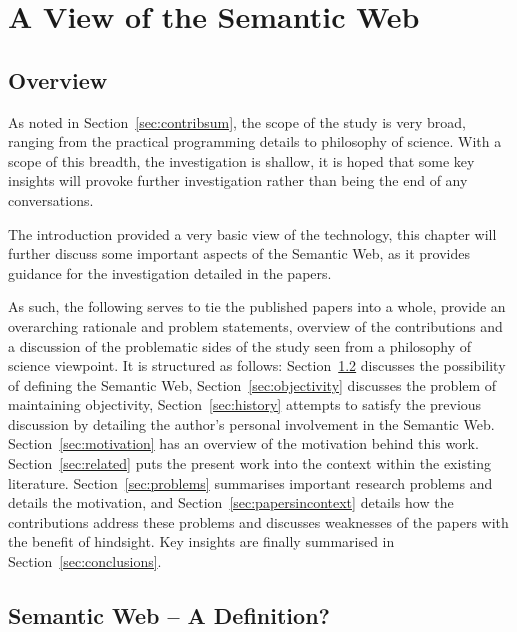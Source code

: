 \chapter{A View of the Semantic Web}

\section{Overview}\label{sec:introoverview}

As noted in Section~\ref{sec:contribsum}, the scope of the study is
very broad, ranging from the practical programming details to
philosophy of science. With a scope of this breadth, the investigation
is shallow, it is hoped that some key insights will provoke further
investigation rather than being the end of any conversations.

The introduction provided a very basic view of the technology, this
chapter will further discuss some important aspects of the Semantic
Web, as it provides guidance for the investigation detailed in the
papers.

As such, the following serves to tie the published papers into a
whole, provide an overarching rationale and problem statements,
overview of the contributions and a discussion of the problematic
sides of the study seen from a philosophy of science viewpoint. It is
structured as follows: Section~\ref{sec:nodef} discusses the
possibility of defining the Semantic Web,
Section~\ref{sec:objectivity} discusses the problem of maintaining
objectivity, Section~\ref{sec:history} attempts to satisfy the
previous discussion by detailing the author's personal involvement in
the Semantic Web. Section~\ref{sec:motivation} has an overview of the
motivation behind this work.  Section~\ref{sec:related} puts the
present work into the context within the existing
literature. Section~\ref{sec:problems} summarises important research
problems and details the motivation, and
Section~\ref{sec:papersincontext} details how the contributions
address these problems and discusses weaknesses of the papers with the
benefit of hindsight. Key insights are finally summarised in
Section~\ref{sec:conclusions}.


\section{Semantic Web -- A Definition?}\label{sec:nodef}

